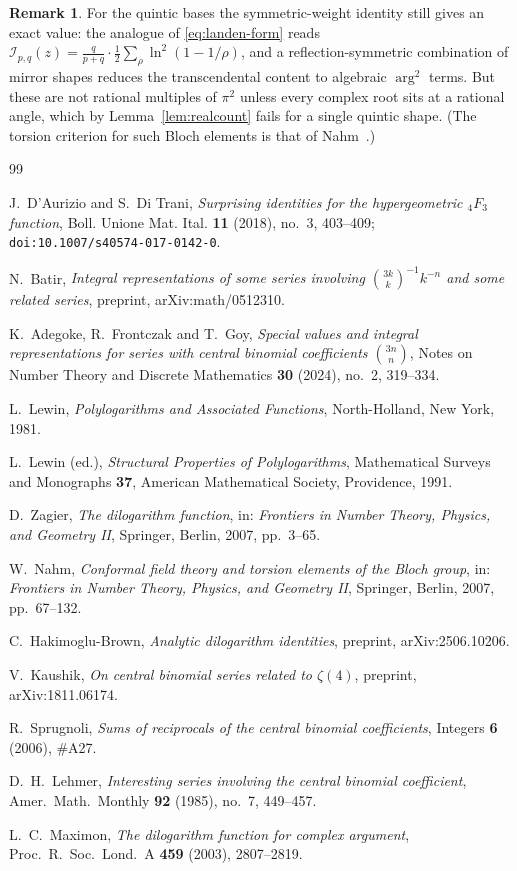 \documentclass[11pt]{article}
\theoremstyle{definition}
\newtheorem{remark}[theorem]{Remark}
\begin{document}
\begin{remark}
For the quintic bases the symmetric-weight identity still gives an exact value: the analogue of
\eqref{eq:landen-form} reads
$\mathcal{I}_{p,q}(z)=\tfrac{q}{p+q}\cdot\tfrac12\sum_\rho\ln^2(1-1/\rho)$,
and a reflection-symmetric combination of mirror shapes reduces the transcendental content to
algebraic $\arg^2$ terms. But these are not rational multiples of $\pi^2$ unless every complex root
sits at a rational angle, which by Lemma~\ref{lem:realcount} fails for a single quintic shape. (The
torsion criterion for such Bloch elements is that of Nahm~\cite{Nahm,Zagier}.)
\end{remark}


\begin{thebibliography}{99}

J.~D'Aurizio and S.~Di Trani,
\emph{Surprising identities for the hypergeometric ${}_4F_3$ function},
Boll. Unione Mat. Ital. \textbf{11} (2018), no.~3, 403--409;
\texttt{doi:10.1007/s40574-017-0142-0}.

N.~Batir,
\emph{Integral representations of some series involving $\binom{3k}{k}^{-1}k^{-n}$ and some
related series},
preprint, arXiv:math/0512310.

K.~Adegoke, R.~Frontczak and T.~Goy,
\emph{Special values and integral representations for series with central binomial coefficients
$\binom{3n}{n}$},
Notes on Number Theory and Discrete Mathematics \textbf{30} (2024), no.~2, 319--334.

L.~Lewin,
\emph{Polylogarithms and Associated Functions},
North-Holland, New York, 1981.

L.~Lewin (ed.),
\emph{Structural Properties of Polylogarithms},
Mathematical Surveys and Monographs \textbf{37}, American Mathematical Society, Providence, 1991.

D.~Zagier,
\emph{The dilogarithm function},
in: \emph{Frontiers in Number Theory, Physics, and Geometry II}, Springer, Berlin, 2007, pp.~3--65.

W.~Nahm,
\emph{Conformal field theory and torsion elements of the Bloch group},
in: \emph{Frontiers in Number Theory, Physics, and Geometry II}, Springer, Berlin, 2007, pp.~67--132.

C.~Hakimoglu-Brown,
\emph{Analytic dilogarithm identities},
preprint, arXiv:2506.10206.

V.~Kaushik,
\emph{On central binomial series related to $\zeta(4)$},
preprint, arXiv:1811.06174.

R.~Sprugnoli,
\emph{Sums of reciprocals of the central binomial coefficients},
Integers \textbf{6} (2006), \#A27.

D.~H.~Lehmer,
\emph{Interesting series involving the central binomial coefficient},
Amer.\ Math.\ Monthly \textbf{92} (1985), no.~7, 449--457.

L.~C.~Maximon,
\emph{The dilogarithm function for complex argument},
Proc.\ R.\ Soc.\ Lond.\ A \textbf{459} (2003), 2807--2819.

\end{thebibliography}
\end{document}

